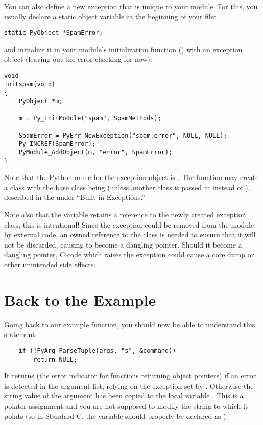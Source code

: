 You can also define a new exception that is unique to your module.
For this, you usually declare a static object variable at the
beginning of your file:

\begin{verbatim}
static PyObject *SpamError;
\end{verbatim}

and initialize it in your module's initialization function
() with an exception object (leaving out
the error checking for now):

\begin{verbatim}
void
initspam(void)
{
    PyObject *m;

    m = Py_InitModule("spam", SpamMethods);

    SpamError = PyErr_NewException("spam.error", NULL, NULL);
    Py_INCREF(SpamError);
    PyModule_AddObject(m, "error", SpamError);
}
\end{verbatim}

Note that the Python name for the exception object is
.  The  function
may create a class with the base class being 
(unless another class is passed in instead of \NULL), described in the
 under ``Built-in
Exceptions.''

Note also that the  variable retains a reference to
the newly created exception class; this is intentional!  Since the
exception could be removed from the module by external code, an owned
reference to the class is needed to ensure that it will not be
discarded, causing  to become a dangling pointer.
Should it become a dangling pointer, C code which raises the exception
could cause a core dump or other unintended side effects.


\section{Back to the Example
         \label{backToExample}}

Going back to our example function, you should now be able to
understand this statement:

\begin{verbatim}
    if (!PyArg_ParseTuple(args, "s", &command))
        return NULL;
\end{verbatim}

It returns \NULL{} (the error indicator for functions returning
object pointers) if an error is detected in the argument list, relying
on the exception set by .  Otherwise the
string value of the argument has been copied to the local variable
.  This is a pointer assignment and you are not supposed
to modify the string to which it points (so in Standard C, the variable
 should properly be declared as ).

